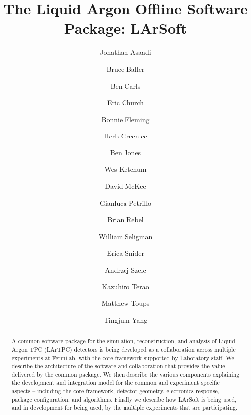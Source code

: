 \documentclass[12pt]{elsarticle}
\begin{document}
\title{The Liquid Argon Offline Software Package: LArSoft} 
\author{Jonathan Asaadi}
\address{}
\ead{}
\author{Bruce Baller}
\address{}
\ead{}
\author{Ben Carls}
\address{}
\ead{}

\author{Eric Church}
\address{Yale University, PO Box 500, MS309, Fermi National Accelerator Lab, Batavia, IL, USA, 60510-5011}
\author{Bonnie Fleming}
\address{Yale University, PO Box XYZ, Physics Department, Yale University, New Haven, CT, USA, 12345-1234}
\author{Herb Greenlee}
\address{}
\ead{}
\author{Ben Jones}
\address{}
\ead{}
\author{Wes Ketchum}
\address{}
\ead{}
\author{David McKee}
\address{}
\ead{}

\author{Gianluca Petrillo}
\address{}
\ead{}
\author{Brian Rebel}
\address{PO Box XYZ, MS309, Fermi National Accelerator Lab, Batavia, IL, USA, 60510-5011}
\author{William Seligman}
\address{Columbia University Nevis Laboratories, PO Box 137, Irvington, NY, USA, 10533}
\author{Erica Snider}
\address{}
\ead{}

\author{Andrzej Szelc}
\address{}
\ead{}

\author{Kazuhiro Terao}
\address{}
\ead{}
\author{Matthew Toups}
\address{}
\ead{}
\author{Tingjum Yang}
\address{}
\ead{}
\begin{abstract}
A common software package for the simulation, reconstruction, and analysis of Liquid Argon TPC (LArTPC) detectors is being developed as a collaboration across multiple experiments at Fermilab, with the core framework supported by Laboratory staff. We describe the architecture of the software and collaboration that provides the value delivered by the common package. We then describe the various components explaining the development and integration model for the common and experiment specific aspects – including the core framework, detector geometry, electronics response, package configuration, and algorithms. Finally we describe how LArSoft is being used, and in development for being used, by the multiple experiments that are participating.

\end{abstract}
\tableofcontents

\maketitle
\end{document}

